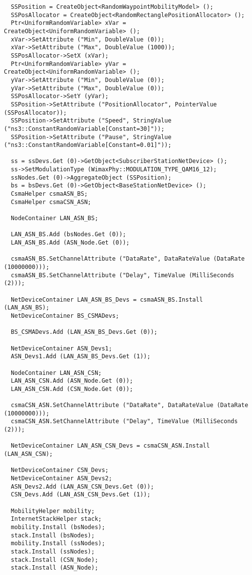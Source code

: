 \documentclass[14pt,a4paper]{article}
\begin{document}
{\begin{verbatim}
  SSPosition = CreateObject<RandomWaypointMobilityModel> ();
  SSPosAllocator = CreateObject<RandomRectanglePositionAllocator> ();
  Ptr<UniformRandomVariable> xVar = CreateObject<UniformRandomVariable> ();
  xVar->SetAttribute ("Min", DoubleValue (0));
  xVar->SetAttribute ("Max", DoubleValue (1000));
  SSPosAllocator->SetX (xVar);
  Ptr<UniformRandomVariable> yVar = CreateObject<UniformRandomVariable> ();
  yVar->SetAttribute ("Min", DoubleValue (0));
  yVar->SetAttribute ("Max", DoubleValue (0));
  SSPosAllocator->SetY (yVar);
  SSPosition->SetAttribute ("PositionAllocator", PointerValue (SSPosAllocator));
  SSPosition->SetAttribute ("Speed", StringValue ("ns3::ConstantRandomVariable[Constant=30]"));
  SSPosition->SetAttribute ("Pause", StringValue ("ns3::ConstantRandomVariable[Constant=0.01]"));

  ss = ssDevs.Get (0)->GetObject<SubscriberStationNetDevice> ();
  ss->SetModulationType (WimaxPhy::MODULATION_TYPE_QAM16_12);
  ssNodes.Get (0)->AggregateObject (SSPosition);
  bs = bsDevs.Get (0)->GetObject<BaseStationNetDevice> ();
  CsmaHelper csmaASN_BS;
  CsmaHelper csmaCSN_ASN;

  NodeContainer LAN_ASN_BS;

  LAN_ASN_BS.Add (bsNodes.Get (0));
  LAN_ASN_BS.Add (ASN_Node.Get (0));

  csmaASN_BS.SetChannelAttribute ("DataRate", DataRateValue (DataRate (10000000)));
  csmaASN_BS.SetChannelAttribute ("Delay", TimeValue (MilliSeconds (2)));

  NetDeviceContainer LAN_ASN_BS_Devs = csmaASN_BS.Install (LAN_ASN_BS);
  NetDeviceContainer BS_CSMADevs;

  BS_CSMADevs.Add (LAN_ASN_BS_Devs.Get (0));

  NetDeviceContainer ASN_Devs1;
  ASN_Devs1.Add (LAN_ASN_BS_Devs.Get (1));

  NodeContainer LAN_ASN_CSN;
  LAN_ASN_CSN.Add (ASN_Node.Get (0));
  LAN_ASN_CSN.Add (CSN_Node.Get (0));

  csmaCSN_ASN.SetChannelAttribute ("DataRate", DataRateValue (DataRate (10000000)));
  csmaCSN_ASN.SetChannelAttribute ("Delay", TimeValue (MilliSeconds (2)));

  NetDeviceContainer LAN_ASN_CSN_Devs = csmaCSN_ASN.Install (LAN_ASN_CSN);

  NetDeviceContainer CSN_Devs;
  NetDeviceContainer ASN_Devs2;
  ASN_Devs2.Add (LAN_ASN_CSN_Devs.Get (0));
  CSN_Devs.Add (LAN_ASN_CSN_Devs.Get (1));

  MobilityHelper mobility;
  InternetStackHelper stack;
  mobility.Install (bsNodes);
  stack.Install (bsNodes);
  mobility.Install (ssNodes);
  stack.Install (ssNodes);
  stack.Install (CSN_Node);
  stack.Install (ASN_Node);


\end{verbatim}}
\end{document}
